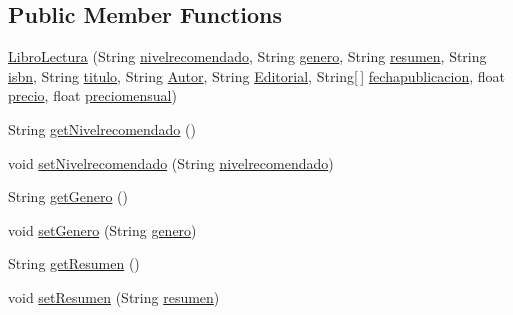 \subsection*{Public Member Functions}
\begin{DoxyCompactItemize}
\item 
\mbox{\hyperlink{classlibreria_1_1_libro_lectura_a34f8c88ca70b9ce47cfa135888e32d51}{Libro\+Lectura}} (String \mbox{\hyperlink{classlibreria_1_1_libro_lectura_a4a163e246538be335d80d56a699bde4c}{nivelrecomendado}}, String \mbox{\hyperlink{classlibreria_1_1_libro_lectura_a165e12f15d25aab5fd957ebf42ad9458}{genero}}, String \mbox{\hyperlink{classlibreria_1_1_libro_lectura_aadbf8eecd32ed6a6dee9202873762707}{resumen}}, String \mbox{\hyperlink{classlibreria_1_1_libro_a855939c41be35682aad6b6c08962dde3}{isbn}}, String \mbox{\hyperlink{classlibreria_1_1_libro_aa45a435366afb4759f59f6f4d86d0e3a}{titulo}}, String \mbox{\hyperlink{classlibreria_1_1_libro_aa5040773b6ae3f4b9538418a4499ba9c}{Autor}}, String \mbox{\hyperlink{classlibreria_1_1_libro_a0e45b510f79de7f6aaa678f4cf060b45}{Editorial}}, String\mbox{[}$\,$\mbox{]} \mbox{\hyperlink{classlibreria_1_1_libro_a1feec01556c7a8ffe5963b544b7ebc58}{fechapublicacion}}, float \mbox{\hyperlink{classlibreria_1_1_libro_ab19a3f31d2aaab1bca6ba4f188951adc}{precio}}, float \mbox{\hyperlink{classlibreria_1_1_libro_aa3ecf9746a1de3547b71c154ffbcbeb7}{preciomensual}})
\item 
String \mbox{\hyperlink{classlibreria_1_1_libro_lectura_ad869056bc2c90f121e3772f5a8cb9093}{get\+Nivelrecomendado}} ()
\item 
void \mbox{\hyperlink{classlibreria_1_1_libro_lectura_aa4701a76d8d8ba58ce628eda33426403}{set\+Nivelrecomendado}} (String \mbox{\hyperlink{classlibreria_1_1_libro_lectura_a4a163e246538be335d80d56a699bde4c}{nivelrecomendado}})
\item 
String \mbox{\hyperlink{classlibreria_1_1_libro_lectura_aa81602c85c93e2db532a7e89840de737}{get\+Genero}} ()
\item 
void \mbox{\hyperlink{classlibreria_1_1_libro_lectura_a14241c20d56f2def080df619d9f6debb}{set\+Genero}} (String \mbox{\hyperlink{classlibreria_1_1_libro_lectura_a165e12f15d25aab5fd957ebf42ad9458}{genero}})
\item 
String \mbox{\hyperlink{classlibreria_1_1_libro_lectura_a5dbe05d1c1c62d9a3685b6898dc49a47}{get\+Resumen}} ()
\item 
void \mbox{\hyperlink{classlibreria_1_1_libro_lectura_a4fdc0bff168769f232f0fd59e90f8395}{set\+Resumen}} (String \mbox{\hyperlink{classlibreria_1_1_libro_lectura_aadbf8eecd32ed6a6dee9202873762707}{resumen}})
\end{DoxyCompactItemize}
